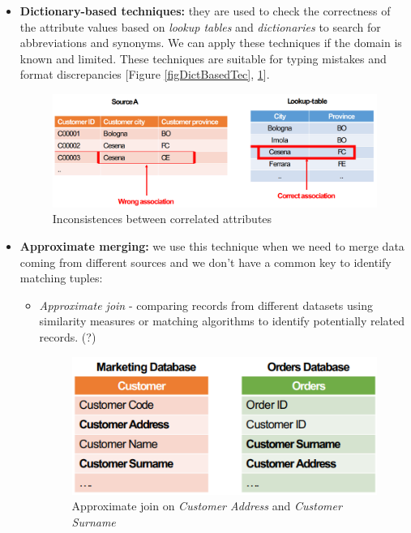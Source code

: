 \begin{itemize}
    \item \textbf{Dictionary-based techniques:} they are used to check the correctness of the attribute values based on \textit{lookup tables} and \textit{dictionaries} to search for abbreviations and synonyms. We can apply these techniques if the domain is known and limited. These techniques are suitable for typing mistakes and format discrepancies [Figure \ref{figDictBasedTec}, \ref{figDictBasedTec2}].
    \begin{figure}[ht!]
        \centering
        \includegraphics[scale=0.43]{images/ETL_dict_based_techniques_2.png}
        \caption{Inconsistences between correlated attributes}
        \label{figDictBasedTec2}
    \end{figure}
    \item \textbf{Approximate merging:} we use this technique when we need to merge data coming from different sources and we don't have a common key to identify matching tuples:
    \begin{itemize}
        \item \textit{Approximate join} - comparing records from different datasets using similarity measures or matching algorithms to identify potentially related records. (?)
        \begin{figure}[ht!]
            \centering
            \includegraphics[scale=0.9]{images/ETL_approximate_join.png}
            \caption{Approximate join on \textit{Customer Address} and \textit{Customer Surname}}
        \end{figure}

\end{itemize}
\end{itemize}
